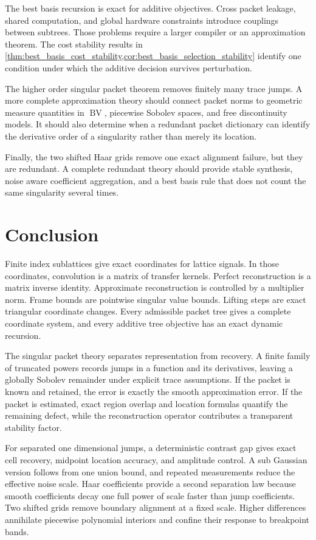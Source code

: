 \documentclass[11pt,a4paper]{article}
\theoremstyle{definition}
\theoremstyle{remark}
\newcommand{\BV}{\operatorname{BV}}
\begin{document}
The best basis recursion is exact for additive objectives. Cross packet leakage, shared computation, and global hardware constraints introduce couplings between subtrees. Those problems require a larger compiler or an approximation theorem. The cost stability results in \cref{thm:best_basis_cost_stability,cor:best_basis_selection_stability} identify one condition under which the additive decision survives perturbation.

The higher order singular packet theorem removes finitely many trace jumps. A more complete approximation theory should connect packet norms to geometric measure quantities in \(\BV\), piecewise Sobolev spaces, and free discontinuity models. It should also determine when a redundant packet dictionary can identify the derivative order of a singularity rather than merely its location.

Finally, the two shifted Haar grids remove one exact alignment failure, but they are redundant. A complete redundant theory should provide stable synthesis, noise aware coefficient aggregation, and a best basis rule that does not count the same singularity several times.

\section{Conclusion}\label{extension:section:16}\label{sec:conclusion}

Finite index sublattices give exact coordinates for lattice signals. In those coordinates, convolution is a matrix of transfer kernels. Perfect reconstruction is a matrix inverse identity. Approximate reconstruction is controlled by a multiplier norm. Frame bounds are pointwise singular value bounds. Lifting steps are exact triangular coordinate changes. Every admissible packet tree gives a complete coordinate system, and every additive tree objective has an exact dynamic recursion.

The singular packet theory separates representation from recovery. A finite family of truncated powers records jumps in a function and its derivatives, leaving a globally Sobolev remainder under explicit trace assumptions. If the packet is known and retained, the error is exactly the smooth approximation error. If the packet is estimated, exact region overlap and location formulas quantify the remaining defect, while the reconstruction operator contributes a transparent stability factor.

For separated one dimensional jumps, a deterministic contrast gap gives exact cell recovery, midpoint location accuracy, and amplitude control. A sub Gaussian version follows from one union bound, and repeated measurements reduce the effective noise scale. Haar coefficients provide a second separation law because smooth coefficients decay one full power of scale faster than jump coefficients. Two shifted grids remove boundary alignment at a fixed scale. Higher differences annihilate piecewise polynomial interiors and confine their response to breakpoint bands.
\end{document}
